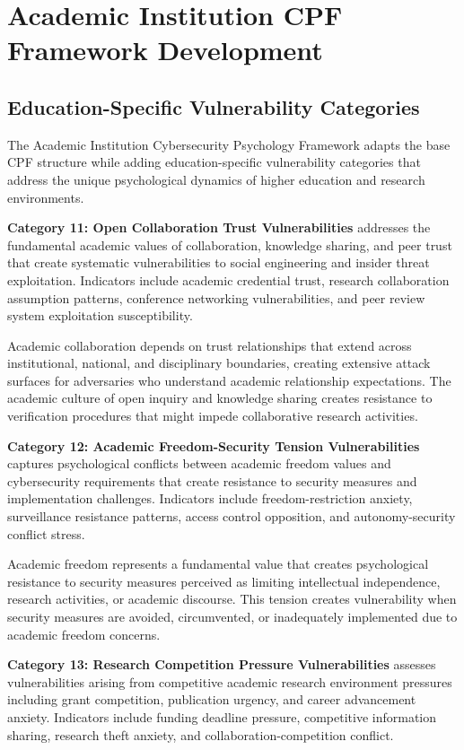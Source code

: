 \documentclass[10pt, twocolumn]{article}
\begin{document}
\section{Academic Institution CPF Framework Development}

\subsection{Education-Specific Vulnerability Categories}

The Academic Institution Cybersecurity Psychology Framework adapts the base CPF structure while adding education-specific vulnerability categories that address the unique psychological dynamics of higher education and research environments.

\textbf{Category 11: Open Collaboration Trust Vulnerabilities} addresses the fundamental academic values of collaboration, knowledge sharing, and peer trust that create systematic vulnerabilities to social engineering and insider threat exploitation. Indicators include academic credential trust, research collaboration assumption patterns, conference networking vulnerabilities, and peer review system exploitation susceptibility.

Academic collaboration depends on trust relationships that extend across institutional, national, and disciplinary boundaries, creating extensive attack surfaces for adversaries who understand academic relationship expectations. The academic culture of open inquiry and knowledge sharing creates resistance to verification procedures that might impede collaborative research activities.

\textbf{Category 12: Academic Freedom-Security Tension Vulnerabilities} captures psychological conflicts between academic freedom values and cybersecurity requirements that create resistance to security measures and implementation challenges. Indicators include freedom-restriction anxiety, surveillance resistance patterns, access control opposition, and autonomy-security conflict stress.

Academic freedom represents a fundamental value that creates psychological resistance to security measures perceived as limiting intellectual independence, research activities, or academic discourse. This tension creates vulnerability when security measures are avoided, circumvented, or inadequately implemented due to academic freedom concerns.

\textbf{Category 13: Research Competition Pressure Vulnerabilities} assesses vulnerabilities arising from competitive academic research environment pressures including grant competition, publication urgency, and career advancement anxiety. Indicators include funding deadline pressure, competitive information sharing, research theft anxiety, and collaboration-competition conflict.
\end{document}
